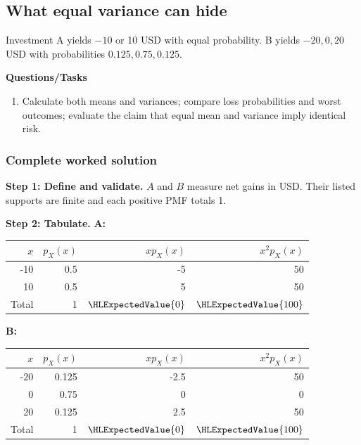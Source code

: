\subsection{What equal variance can hide}
Investment A yields $-10$ or 10 USD with equal probability. B yields $-20,0,20$ USD with probabilities $0.125,0.75,0.125$.

\textbf{Questions/Tasks}
\begin{enumerate}
\item Calculate both means and variances; compare loss probabilities and worst outcomes; evaluate the claim that equal mean and variance imply identical risk.
\end{enumerate}
\subsubsection*{Complete worked solution}
\par\noindent\begin{minipage}{\linewidth}
\textbf{Step 1: Define and validate.} $A$ and $B$ measure net gains in USD. Their listed supports are finite and each positive PMF totals 1.
\end{minipage}\par\medskip
\par\noindent\begin{minipage}{\linewidth}
\textbf{Step 2: Tabulate.} \textbf{A:}\begin{center}
\begin{tabular}{rrrr}
\toprule
$x$ & $p_X(x)$ & $xp_X(x)$ & $x^2p_X(x)$ \\ \midrule
-10 & 0.5 & -5 & 50 \\
10 & 0.5 & 5 & 50 \\
Total & 1 & $\HLExpectedValue{0}$ & $\HLExpectedValue{100}$ \\
\bottomrule
\end{tabular}
\end{center}
\textbf{B:}\begin{center}
\begin{tabular}{rrrr}
\toprule
$x$ & $p_X(x)$ & $xp_X(x)$ & $x^2p_X(x)$ \\ \midrule
-20 & 0.125 & -2.5 & 50 \\
0 & 0.75 & 0 & 0 \\
20 & 0.125 & 2.5 & 50 \\
Total & 1 & $\HLExpectedValue{0}$ & $\HLExpectedValue{100}$ \\
\bottomrule
\end{tabular}
\end{center}

\end{minipage}\par\medskip
